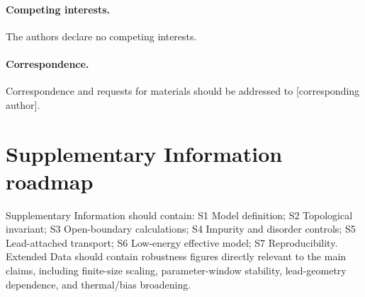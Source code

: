 \documentclass[11pt]{article}
\begin{document}
\paragraph{Competing interests.}
The authors declare no competing interests. %

\paragraph{Correspondence.}
Correspondence and requests for materials should be addressed to [corresponding author].

\section*{Supplementary Information roadmap}

Supplementary Information should contain: S1 Model definition; S2 Topological invariant; S3 Open-boundary calculations; S4 Impurity and disorder controls; S5 Lead-attached transport; S6 Low-energy effective model; S7 Reproducibility. Extended Data should contain robustness figures directly relevant to the main claims, including finite-size scaling, parameter-window stability, lead-geometry dependence, and thermal/bias broadening.




\end{document}
